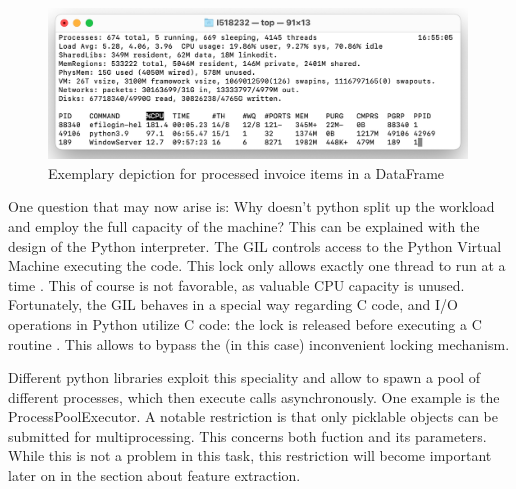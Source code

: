 	\begin{figure}[ht]
		\centering
		\includegraphics[height=4cm]{Bilder/practical/python_processes.png}
		\caption{Exemplary depiction for processed invoice items in a DataFrame}
		\label{fig:df-invoices}
	\end{figure}
	
	
	One question that may now arise is: Why doesn't python split up the workload and employ the full capacity of the machine?
	This can be explained with the design of the Python interpreter. The \ac{GIL} controls access to the Python Virtual Machine executing the code. This lock only allows exactly one thread to run at a time \cite{corePython}. This of course is not favorable, as valuable CPU capacity is unused. Fortunately, the \ac{GIL} behaves in a special way regarding C code, and I/O operations in Python utilize C code: the lock is released before executing a C routine \cite{corePython}. This allows to bypass the (in this case) inconvenient locking mechanism. 
	
	Different python libraries exploit this speciality and allow to spawn a pool of different processes, which then execute calls asynchronously. One example is the ProcessPoolExecutor. A notable restriction is that only picklable objects can be submitted for multiprocessing. This concerns both fuction and its parameters. While this is not a problem in this task, this restriction will become important later on in the section about feature extraction.
	
	
	
	

